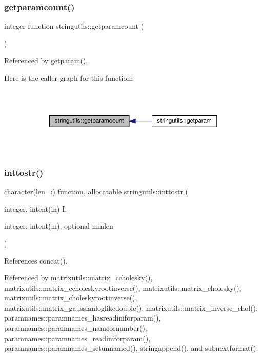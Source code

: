 \subsubsection{\texorpdfstring{getparamcount()}{getparamcount()}}
{\footnotesize\ttfamily integer function stringutils\+::getparamcount (\begin{DoxyParamCaption}{ }\end{DoxyParamCaption})}



Referenced by getparam().

Here is the caller graph for this function\+:
\nopagebreak
\begin{figure}[H]
\begin{center}
\leavevmode
\includegraphics[width=350pt]{namespacestringutils_a8837c1b537afbf19f8138389d9cdf434_icgraph}
\end{center}
\end{figure}
\mbox{\label{namespacestringutils_a8308d148fc2d1fd7e23aea926bfd837f}} 
\subsubsection{\texorpdfstring{inttostr()}{inttostr()}}
{\footnotesize\ttfamily character(len=\+:) function, allocatable stringutils\+::inttostr (\begin{DoxyParamCaption}\item[{integer, intent(in)}]{I,  }\item[{integer, intent(in), optional}]{minlen }\end{DoxyParamCaption})}



References concat().



Referenced by matrixutils\+::matrix\+\_\+ccholesky(), matrixutils\+::matrix\+\_\+ccholeskyrootinverse(), matrixutils\+::matrix\+\_\+cholesky(), matrixutils\+::matrix\+\_\+choleskyrootinverse(), matrixutils\+::matrix\+\_\+gaussianloglikedouble(), matrixutils\+::matrix\+\_\+inverse\+\_\+chol(), paramnames\+::paramnames\+\_\+hasreadiniforparam(), paramnames\+::paramnames\+\_\+nameornumber(), paramnames\+::paramnames\+\_\+readiniforparam(), paramnames\+::paramnames\+\_\+setunnamed(), stringappend(), and subnextformat().

